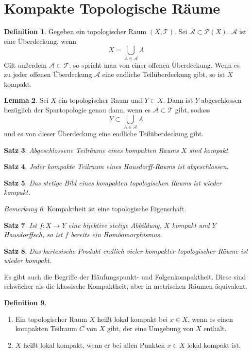 \documentclass[a4paper, 12pt]{article}
\theoremstyle{plain}
\newtheorem{theorem}{Satz}[section] %
\theoremstyle{definition}
\newtheorem{definition}[theorem]{Definition} %
\theoremstyle{lemma}
\newtheorem{lemma}[theorem]{Lemma}
\theoremstyle{remark}
\newtheorem{remark}[theorem]{Bemerkung}
\theoremstyle{corollary}
\theoremstyle{example}
\begin{document}
	\section{Kompakte Topologische Räume}
	\begin{definition}
		Gegeben ein topologischer Raum $(X,\mathcal{T})$. Sei $\mathcal{A}\subset \mathcal{P}(X)$. $\mathcal{A}$ ist eine Überdeckung, wenn \[X = \bigcup_{A \in \mathcal{A}} A\] Gilt außerdem $\mathcal{A} \subset \mathcal{T}$, so spricht man von einer offenen Überdeckung. Wenn es zu jeder offenen Überdeckung $\mathcal{A}$ eine endliche Teilüberdeckung gibt, so ist $X$ kompakt.
	\end{definition}
	\begin{lemma}
		Sei $X$ ein topologischer Raum und $Y\subset X$. Dann ist $Y$ abgeschlossen bezüglich der Spurtopologie genau dann, wenn es $\mathcal{A} \subset \mathcal{T}$ gibt, sodass \[Y \subset \bigcup_{A \in \mathcal{A}} A\] und es von dieser Überdeckung eine endliche Teilüberdeckung gibt.
	\end{lemma}
	\begin{theorem}
		Abgeschlossene Teilräume eines kompakten Raums $X$ sind kompakt.
	\end{theorem}
	\begin{theorem}
		Jeder kompakte Teilraum eines Hausdorff-Raums ist abgeschlossen.
	\end{theorem}
	\begin{theorem}
		Das stetige Bild eines kompakten topologischen Raums ist wieder kompakt.
	\end{theorem}
	\begin{remark}
		Kompaktheit ist eine topologische Eigenschaft.
	\end{remark}
	\begin{theorem}
		Ist $f:X\to Y$ eine bijektive stetige Abbildung, $X$ kompakt und $Y$ Hausdorffsch, so ist $f$ bereits ein Homöomorphismus.
	\end{theorem}
	\begin{theorem}
		Das kartesische Produkt endlich vieler kompakter topologischer Räume ist wieder kompakt.
	\end{theorem}
	Es gibt auch die Begriffe der Häufungspunkt- und Folgenkompaktheit. Diese sind schwächer als die klassische Kompaktheit, aber in metrischen Räumen äquivalent.
	\begin{definition}
		\begin{enumerate}
			\item Ein topologischer Raum $X$ heißt lokal kompakt bei $x\in X$, wenn es einen kompakten Teilraum $C$ von $X$ gibt, der eine Umgebung von $X$ enthält.
			\item $X$ heißt lokal kompakt, wenn er bei allen Punkten $x\in X$ lokal kompakt ist.
		\end{enumerate}
	\end{definition}
\end{document}
